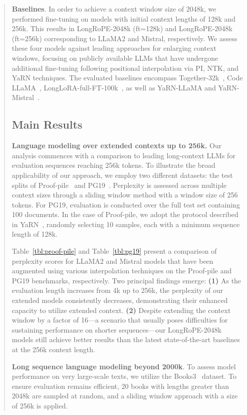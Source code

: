 \begin{abstract}
\textbf{Baselines}. In order to achieve a context window size of 2048k, we performed fine-tuning on models with initial context lengths of 128k and 256k. This results in LongRoPE-2048k (ft=128k) and LongRoPE-2048k (ft=256k) corresponding to LLaMA2 and Mistral, respectively. We assess these four models against leading approaches for enlarging context windows, focusing on publicly available LLMs that have undergone additional fine-tuning following positional interpolation via PI, NTK, and YaRN techniques. The evaluated baselines encompass Together-32k~\cite{together}, Code LLaMA~\cite{codellama}, LongLoRA-full-FT-100k~\cite{longlora}, as well as YaRN-LLaMA and YaRN-Mistral~\cite{yarn}.

\subsection{Main Results}

\label{sec:mainresult}
\textbf{Language modeling over extended contexts up to 256k.} Our analysis commences with a comparison to leading long-context LLMs for evaluation sequences reaching 256k tokens. To illustrate the broad applicability of our approach, we employ two different datasets: the test splits of Proof-pile~\cite{pg19} and PG19~\cite{pile}. Perplexity is assessed across multiple context sizes through a sliding window method with a window size of 256 tokens. For PG19, evaluation is conducted over the full test set containing 100 documents. In the case of Proof-pile, we adopt the protocol described in YaRN~\cite{yarn}, randomly selecting 10 samples, each with a minimum sequence length of 128k.

Table~\ref{tbl:proof-pile} and Table~\ref{tbl:pg19} present a comparison of perplexity scores for LLaMA2 and Mistral models that have been augmented using various interpolation techniques on the Proof-pile and PG19 benchmarks, respectively. Two principal findings emerge: \textbf{(1)} As the evaluation length increases from 4k up to 256k, the perplexity of our extended models consistently decreases, demonstrating their enhanced capacity to utilize extended context. \textbf{(2)} Despite extending the context window by a factor of 16—a scenario that usually poses difficulties for sustaining performance on shorter sequences—our LongRoPE-2048k models still achieve better results than the latest state-of-the-art baselines at the 256k context length.

\textbf{Long sequence language modeling beyond 2000k}. To assess model performance on very large-scale texts, we utilize the Books3~\cite{pile} dataset. To ensure evaluation remains efficient, 20 books with lengths greater than 2048k are sampled at random, and a sliding window approach with a size of 256k is applied.


\end{abstract}
